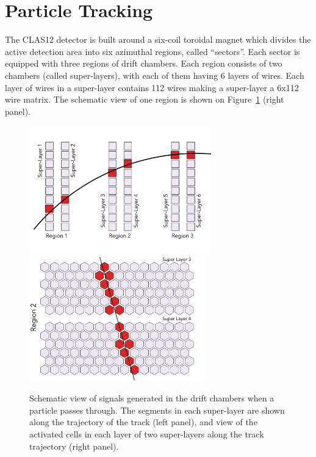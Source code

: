\section{Particle Tracking}

The CLAS12\cite{Burkert:2020akg} detector is built around a six-coil toroidal magnet which divides the active detection area into six azimuthal regions, called ``sectors''. Each sector is equipped with three regions of drift chambers. Each region consists of two chambers (called super-layers), with each of them having 6 layers of wires. Each layer of wires in a super-layer contains 112 wires making a super-layer a 6x112 wire matrix. The schematic view of one region  is shown on Figure~\ref{dc:side_view} (right panel).

\begin{figure}[!ht]
\begin{center}
 \includegraphics[width=3.1in]{images/dc_diagram.pdf}
 \includegraphics[width=3in]{images/region_2_diagram.pdf}
\caption {Schematic view of signals generated in the drift chambers when a particle passes through. The segments in each super-layer are shown along the trajectory of the track (left panel), and view of the activated cells in each layer of two super-layers along the track trajectory (right panel).}
 \label{dc:side_view}
 \end{center}
\end{figure}


